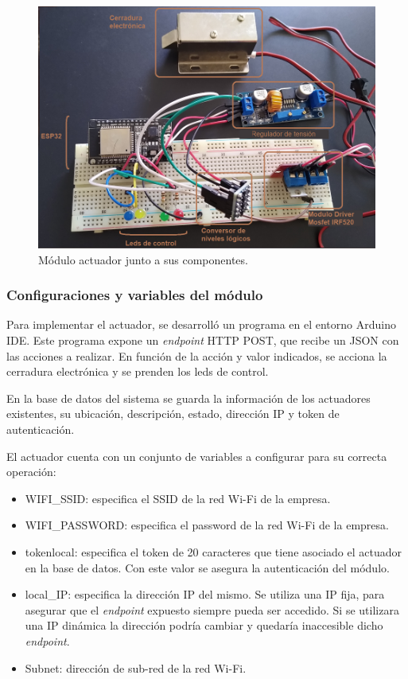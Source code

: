\begin{figure}[ht]
	\centering
	\includegraphics[width=1\textwidth]{./Figures/moduloActuador.png}
	\caption{Módulo actuador junto a sus componentes.}
	\label{fig:moduloActuador}
\end{figure}

\subsubsection{Configuraciones y variables del módulo}

Para implementar el actuador, se desarrolló un programa en el entorno Arduino IDE. Este programa expone un \textit{endpoint} HTTP POST, que recibe un JSON con las acciones a realizar. En función de la acción y valor indicados, se acciona la cerradura electrónica y se prenden los leds de control.

En la base de datos del sistema se guarda la información de los actuadores existentes, su ubicación, descripción, estado, dirección IP y token de autenticación.

El actuador cuenta con un conjunto de variables a configurar para su correcta operación:

\begin{itemize}
\item WIFI\_SSID: especifica el SSID de la red Wi-Fi de la empresa.
\item WIFI\_PASSWORD: especifica el password de la red Wi-Fi de la empresa.
\item tokenlocal: especifica el token de 20 caracteres que tiene asociado el actuador en la base de datos. Con este valor se asegura la autenticación del módulo.
\item local\_IP: especifica la dirección IP del mismo. Se utiliza una IP fija, para asegurar que el \textit{endpoint} expuesto siempre pueda ser accedido. Si se utilizara una IP dinámica la dirección podría cambiar y quedaría inaccesible dicho \textit{endpoint}.
\item Subnet: dirección de sub-red de la red Wi-Fi.
\end{itemize}

